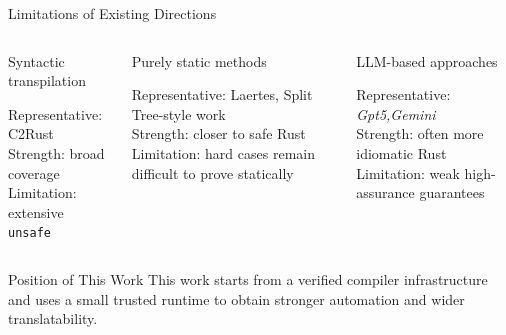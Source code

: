 \documentclass[aspectratio=169,11pt,professionalfonts]{beamer}
\newcommand{\good}[1]{\textcolor{SJTUBlue}{#1}}
\begin{document}
\begin{frame}{Limitations of Existing Directions}
\small
\begin{columns}[T, onlytextwidth]
  \begin{block}{Syntactic transpilation}
    \begin{minipage}[t][3cm][t]{\textwidth} %
      Representative: C2Rust\\
      Strength: broad coverage\\
      Limitation: extensive \texttt{unsafe}
    \end{minipage}
  \end{block}

  \begin{block}{Purely static methods}
    \begin{minipage}[t][3cm][t]{\textwidth}
      Representative: Laertes, Split Tree-style work\\
      Strength: closer to safe Rust\\
      Limitation: hard cases remain difficult to prove statically
    \end{minipage}
  \end{block}

  \begin{block}{LLM-based approaches}
    \begin{minipage}[t][3cm][t]{\textwidth}
      Representative: \textit{Gpt5,Gemini}\\ %
      Strength: often more idiomatic Rust\\
      Limitation: weak high-assurance guarantees
    \end{minipage}
  \end{block}
\end{columns}

  \vspace{0.8em}
  \begin{block}{Position of This Work}
    This work starts from a verified compiler infrastructure and uses a small trusted runtime
    to obtain \good{stronger automation and wider translatability}.
  \end{block}
\end{frame}

\end{document}
